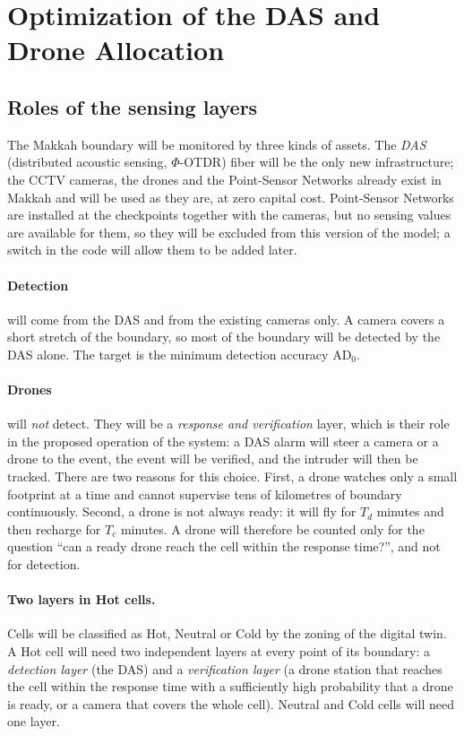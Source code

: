 \documentclass[11pt,a4paper]{article}
\newcommand{\ADzero}{\mathrm{AD}_{0}}
\begin{document}
\section{Optimization of the DAS and Drone Allocation}
\label{sec:optimization}

\subsection{Roles of the sensing layers}
The Makkah boundary will be monitored by three kinds of assets. The \emph{DAS} (distributed acoustic sensing, $\Phi$-OTDR) fiber will be the only new
infrastructure; the CCTV cameras, the drones and the Point-Sensor Networks already exist in Makkah and will be used as they are, at zero capital cost.
Point-Sensor Networks are installed at the checkpoints together with the cameras, but no sensing values are available for them, so they will be excluded from
this version of the model; a switch in the code will allow them to be added later.

\paragraph{Detection} will come from the DAS and from the existing cameras only. A camera covers a short stretch of the boundary, so most of the
boundary will be detected by the DAS alone. The target is the minimum detection accuracy $\ADzero$.

\paragraph{Drones} will \emph{not} detect. They will be a \emph{response and verification} layer, which is their role in the proposed operation of the system:
a DAS alarm will steer a camera or a drone to the event, the event will be verified, and the intruder will then be tracked. There are two reasons for this choice.
First, a drone watches only a small footprint at a time and cannot supervise tens of kilometres of boundary continuously. Second, a drone is not always ready:
it will fly for $T_{d}$ minutes and then recharge for $T_{c}$ minutes. A drone will therefore be counted only for the question ``can a ready drone reach the cell
within the response time?'', and not for detection.

\paragraph{Two layers in Hot cells.} Cells will be classified as Hot, Neutral or Cold by the zoning of the digital twin. A Hot cell will need two independent layers
at every point of its boundary: a \emph{detection layer} (the DAS) and a \emph{verification layer} (a drone station that reaches the cell within the response time
with a sufficiently high probability that a drone is ready, or a camera that covers the whole cell). Neutral and Cold cells will need one layer.
\end{document}
